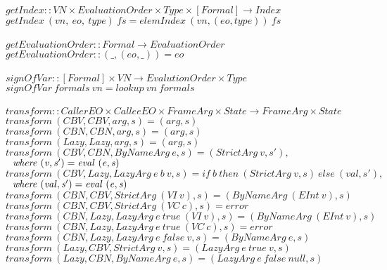 \documentclass[diploma]{softlab-thesis}
\begin{document}
\begin{figure}[h]
  $\mathit{getIndex :: VN \times EvaluationOrder \times Type \times [Formal] \rightarrow Index}$ \\
  $\mathit{getIndex~(vn,~eo,~type)~fs=elemIndex~(vn,(eo,type))~fs}$ \\
  \\
  $\mathit{getEvaluationOrder :: Formal \rightarrow EvaluationOrder} $ \\
  $\mathit{getEvaluationOrder :: (\_, (eo, \_)) = eo}$ \\
  \\%
  $\mathit{signOfVar :: [Formal] \times VN \rightarrow EvalutionOrder \times Type } $ \\
  $\mathit{signOfVar~formals~vn = lookup~vn~formals}$ \\
  \\%
  $\mathit{transform :: CallerEO \times CalleeEO \times FrameArg \times 
            State \rightarrow FrameArg \times State}$ \\
  $\mathit{transform~(CBV, CBV, arg, s) = (arg, s)}$ \\
  $\mathit{transform~(CBN, CBN, arg, s) = (arg, s)}$ \\
  $\mathit{transform~(Lazy, Lazy, arg, s) = (arg, s)}$ \\
  $\mathit{transform~(CBV, CBN, ByNameArg~e, s) = (StrictArg~v, s'),}$ \\
  $\mathit{\hfill\ \hfill\ where~(v, s') = eval~(e, s)}$ \\
  $\mathit{transform~(CBV, Lazy, LazyArg~e~b~v, s) = 
              if~b~then~(StrictArg~v, s)~else~(val, s'),}$ \\
  $\mathit{\hfill\ \hfill\ where~(val, s') = eval~(e, s)} $ \\
  $\mathit{transform~(CBN, CBV, StrictArg~(VI~v),s)=(ByNameArg~(EInt~v),s)}$ \\
  $\mathit{transform~(CBN, CBV, StrictArg~(VC~c),s)=error}$ \\
  $\mathit{transform~(CBN, Lazy, LazyArg~e~true~(VI~v), s) = (ByNameArg~(EInt~v), s)}$ \\
  $\mathit{transform~(CBN, Lazy, LazyArg~e~true~(VC~c), s) = error}$ \\
  $\mathit{transform~(CBN, Lazy, LazyArg~e~false~v, s) = (ByNameArg~e, s)}$ \\
  $\mathit{transform~(Lazy, CBV, StrictArg~v, s) = (LazyArg~e~true~v, s)}$ \\
  $\mathit{transform~(Lazy, CBN, ByNameArg~e, s) = (LazyArg~e~false~null, s)}$ \\

\end{figure}
\end{document}
